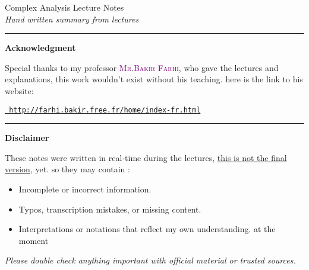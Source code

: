 \documentclass{report}
\begin{document}
\begin{titlepage}
  \begin{center}
    \vspace*{2cm}
    {\LARGE Complex Analysis Lecture Notes}
    \\
    \vspace{1cm}
    {\large \it Hand written summary from lectures}
    \normalfont
  \end{center}
  \rule{\textwidth}{0.4pt}
  \begin{center}
    \textbf{Acknowledgment}
  \end{center}
  \begin{center}
    Special thanks to my professor \textsc{\textcolor{purple}{\large Mr.Bakir Farhi}}\normalfont,
    who gave the lectures and explanations,
    this work wouldn't exist without his teaching. here is the link to his website:
  \end{center}
    \begin{center}
  \href{
  http://farhi.bakir.free.fr/home/index-fr.html
  }{\texttt{ \large
  http://farhi.bakir.free.fr/home/index-fr.html}}
\end{center}
\vspace{0.4cm}
  \begin{center}
  \rule{\textwidth}{0.4pt}
    \textbf{Disclaimer}
  \end{center}
  \begin{center}
    These notes were written in real-time
    during the lectures,
    \underline{this is not the final version}, yet. so they may contain :
    \begin{itemize}
      \item
        Incomplete or incorrect information.
      \item
        Typos, transcription mistakes, or missing content.
      \item
        Interpretations or notations that reflect my own understanding.
        at the moment
    \end{itemize}
  \end{center}
  \vfill
  \begin{center}
    \it
    \large
    Please double check anything important with official
    material or trusted sources. \normalfont
  \end{center}
\end{titlepage}
\end{document}
